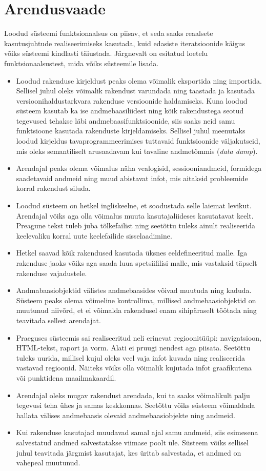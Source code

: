 \documentclass[a4paper,12pt]{article} %
\begin{document}
\section{Arendusvaade}
Loodud süsteemi funktsionaalsus on piisav, et seda saaks reaalsete kasutusjuhtude realiseerimiseks kasutada, kuid edasiste iteratsioonide käigus võiks süsteemi kindlasti täiustada. Järgnevalt on esitatud loetelu funktsionaalsustest, mida võiks süsteemile lisada.
\begin{itemize}
\item Loodud rakenduse kirjeldust peaks olema võimalik eksportida ning importida. Sellisel juhul oleks võimalik rakendust varundada ning taastada ja kasutada versioonihaldustarkvara rakenduse versioonide haldamiseks. Kuna loodud süsteem kasutab ka ise andmebaasiliidest ning kõik rakendustega seotud tegevused tehakse läbi andmebaasifunktsioonide, siis saaks neid samu funktsioone kasutada rakenduste kirjeldamiseks. Sellisel juhul meenutaks loodud kirjeldus tavaprogrammeerimises tuttavaid funktsioonide väljakutseid, mis oleks semantiliselt arusaadavam kui tavaline andmetõmmis (\textit{data dump}).
\item Arendajal peaks olema võimalus näha vealogisid, sessiooniandmeid, formidega saadetavaid andmeid ning muud abistavat infot, mis aitaksid probleemide korral rakendust siluda.
\item Loodud süsteem on hetkel ingliskeelne, et soodustada selle laiemat levikut. Arendajal võiks aga olla võimalus muuta kasutajaliideses kasutatavat keelt. Preagune tekst tuleb juba tõlkefailist ning seetõttu tuleks ainult realiseerida keelevaliku korral uute keelefailide sisselaadimine.
\item Hetkel saavad kõik rakendused kasutada üksnes eeldefineeritud malle. Iga rakenduse jaoks võiks aga saada luua spetsiifilisi malle, mis vastaksid täpselt rakenduse vajadustele.
\item Andmabaasiobjektid välistes andmebaasides võivad muutuda ning kaduda. Süsteem peaks olema võimeline kontrollima, millised andmebaasiobjektid on muutunud niivõrd, et ei võimalda rakendusel enam sihipäraselt töötada ning teavitada sellest arendajat.
\item Praeguses süsteemis sai realiseeritud neli erinevat regioonitüüpi: navigatsioon, HTML-tekst, raport ja vorm. Alati ei pruugi nendest aga piisata. Seetõttu tuleks uurida, millisel kujul oleks veel vaja infot kuvada ning realiseerida vastavad regioonid. Näiteks võiks olla võimalik kujutada infot graafikutena või punktidena maailmakaardil.
\item Arendajal oleks mugav rakendust arendada, kui ta saaks võimalikult palju tegevusi teha ühes ja samas keskkonnas. Seetõttu võiks süsteem võimaldada hallata välises andmebaasis olevaid andmebaasiobjekte ning andmeid.
\item Kui rakenduse kasutajad muudavad samal ajal samu andmeid, siis esimesena salvestatud andmed salvestatakse viimase poolt üle. Süsteem võiks sellisel juhul teavitada järgmist kasutajat, kes üritab salvestada, et andmed on vahepeal muutunud.
\end{itemize}
\end{document}
